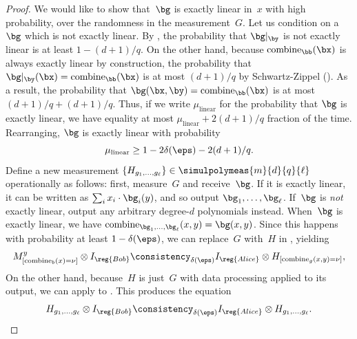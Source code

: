 \begin{proof}
We would like to show that~$\bg$ is exactly linear in~$x$ with high probability, over the randomness in the measurement~$G$.
Let us condition on a $\bg$ which is not exactly linear.
By , the probability that $\bg|_{\by}$ is not exactly linear is at least $1-(d+1)/q$.
On the other hand, because $\mathrm{combine}_{\bb}(\bx)$ is always exactly linear by construction,
the probability that $\bg|_{\by}(\bx) = \mathrm{combine}_{\bb}(\bx)$ is at most $(d+1)/q$ by Schwartz-Zippel ().
As a result, the probability that $\bg(\bx, \by) = \mathrm{combine}_{\bb}(\bx)$ is at most $(d+1)/q + (d+1)/q$.
Thus, if we write $\mu_{\mathrm{linear}}$ for the probability that $\bg$ is exactly linear, we have equality at most $\mu_{\mathrm{linear}} + 2(d+1)/q$ fraction of the time.
Rearranging, $\bg$ is exactly linear with probability
\begin{equation*}
\mu_{\mathrm{linear}} \geq 1 - 2\delta(\eps) - 2(d+1)/q.
\end{equation*}
Define a new measurement $\{H_{g_1, \ldots, g_\ell}\} \in \simulpolymeas{m}{d}{q}{\ell}$ operationally as follows: first, measure~$G$ and receive~$\bg$.
If it is exactly linear, it can be written as $\sum_i x_i \cdot \bg_i(y)$, and so output $\bg_1, \ldots, \bg_\ell$.
If~$\bg$ is \emph{not} exactly linear, output any arbitrary degree-$d$ polynomials instead.
When~$\bg$ is exactly linear, we have $\mathrm{combine}_{\bg_1, \ldots, \bg_\ell}(x, y) = \bg(x, y)$.
Since this happens with probability at least $1-\delta(\eps)$,
we can replace~$G$ with~$H$ in , yielding
\begin{equation}\label{eq:no-name-is-a-bad-name}
M^y_{[\mathrm{combine}_b(x)=\nu]} \otimes I_{\reg{Bob}}
\consistency_{\delta(\eps)} I_{\reg{Alice}} \otimes H_{[\mathrm{combine}_g(x, y) = \nu]},
\end{equation}
On the other hand, because~$H$ is just~$G$ with data processing applied to its output,
we can apply  to . This produces the equation
\begin{equation*}
H_{g_1, \ldots, g_\ell} \otimes I_{\reg{Bob}} \consistency_{\delta(\eps)} I_{\reg{Alice}} \otimes H_{g_1, \ldots, g_\ell}.
\end{equation*}


\end{proof}

